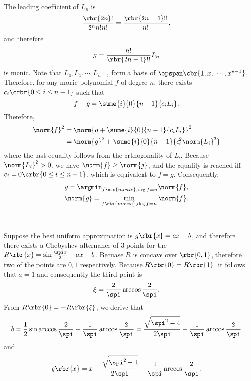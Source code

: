 \documentclass[english, nochinese]{../TeXTemplate/pkupaper}
\begin{document}
\begin{thmquestion}
\
\begin{thmproof}
The leading coefficient of $L_n$ is
\begin{equation}
\frac{ \rbr{ 2 n } ! }{ 2^n n ! n ! } = \frac{ \rbr{ 2 n - 1 } !! }{ n ! },
\end{equation}
and therefore
\begin{equation}
g = \frac{ n ! }{ \rbr{ 2 n - 1 } !! } L_n
\end{equation}
is monic. Note that $ L_0, L_1, \cdots, L_{ n - 1 } $ form a basis of $ \opspan \cbr{ 1, x, \cdots, x^{ n - 1 } } $. Therefore, for any monic polynomial $f$ of degree $n$, there exists $ c_i \crbr{ 0 \le i \le n - 1 } $ such that
\begin{equation}
f - g = \sume{i}{0}{ n - 1 }{ c_i L_i }.
\end{equation}
Therefore,
\begin{equation}
\begin{split}
\norm{f}^2 &= \norm{ g + \sume{i}{0}{ n - 1 }{ c_i L_i }}^2 \\
&= \norm{g}^2 + \sume{i}{0}{ n - 1 }{ c_i^2 \norm{L_i}^2 }
\end{split}
\end{equation}
where the last equality follows from the orthogonality of $L_i$. Because $ \norm{L_i}^2 > 0 $, we have $ \norm{f} \ge \norm{g} $, and the equality is reached iff $ c_i = 0 \crbr{ 0 \le i \le n - 1 } $, which is equivalent to $ f = g $. Consequently,
\begin{gather}
g = \argmin_{ f \mtx{monic}, \deg f = n } \norm{f}, \\
\norm{g} = \min_{ f \mtx{monic}, \deg f = n } \norm{f}.
\end{gather}

\sqed
\end{thmproof}
\end{thmquestion}

\begin{thmanswer}
\ 
\begin{thmquestion}
Suppose the best uniform approximation is $ g \rbr{x} = a x + b $, and therefore there exists a Chebyshev alternance of $3$ points for the $ R \rbr{x} = \sin \frac{ \spi x }{2} - a x - b $. Becuase $R$ is concave over $ \rbr{ 0, 1 } $, therefore two of the points are $ 0, 1 $ respectively. Because $ R \rbr{0} = R \rbr{1} $, it follows that $ a = 1 $ and consequently the third point is
\begin{equation}
\xi = \frac{2}{\spi} \arccos \frac{2}{\spi}.
\end{equation}
From $ R \rbr{0} = -R \rbr{\xi} $, we derive that
\begin{equation}
b = \frac{1}{2} \sin \arccos \frac{2}{\spi} - \frac{1}{\spi} \arccos \frac{2}{\spi} =  \frac{\sqrt{ \spi^2 - 4 }}{ 2 \spi } - \frac{1}{\spi} \arccos \frac{2}{\spi}
\end{equation}
and
\begin{equation}
g \rbr{x} = x + \frac{\sqrt{ \spi^2 - 4 }}{ 2 \spi } - \frac{1}{\spi} \arccos \frac{2}{\spi}.
\end{equation}
\end{thmquestion}
\end{thmanswer}
\end{document}
